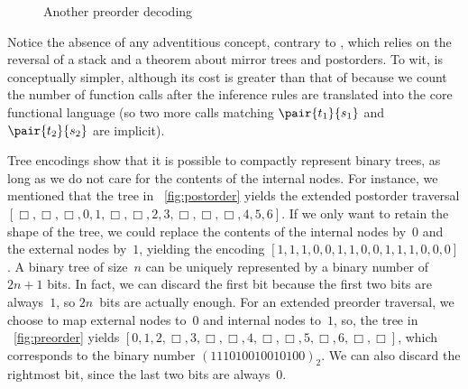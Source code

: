 \begin{figure}[b]
\abovedisplayskip=0pt
\belowdisplayskip=0pt
\centering
{}
\caption{Another preorder decoding}
\label{fig:pre2b0}
\end{figure}
Notice the absence of any adventitious concept, contrary to
, which relies on the
reversal of a stack and a theorem about mirror
trees and postorders. To wit,
 is conceptually
simpler, although its cost is greater than that of
 because we count the number
of function calls after the inference rules
are translated into the core functional language (so two more calls
matching \(\pair{t_1}{s_1}\) and \(\pair{t_2}{s_2}\) are implicit).

Tree encodings show that it is possible to compactly represent binary
trees, as long as we do not care for the contents of the internal
nodes. For instance, we mentioned that the tree in
\fig~\vref{fig:postorder} yields the extended postorder traversal \([\Box, \Box, \Box, 0, 1, \Box,
  \Box, 2, 3, \Box, \Box, \Box, 4, 5, 6]\). If we only want to retain
the shape of the tree, we could replace the contents of the internal
nodes by~\(0\) and the external nodes by~\(1\), yielding the encoding
\([1,1,1,0,0,1,1,0,0,1,1,1,0,0,0]\). A binary tree of size~\(n\) can
be uniquely represented by a binary number of \(2n+1\) bits. In fact,
we can discard the first bit because the first two bits are
always~\(1\), so \(2n\)~bits are actually enough. For an extended
preorder traversal, we choose to map external nodes to~\(0\) and
internal nodes to~\(1\), so, the tree in \fig~\vref{fig:preorder}
yields \([0, 1, 2, \Box, 3, \Box, \Box, 4, \Box, \Box, 5, \Box, 6,
  \Box, \Box]\), which corresponds to the binary number
\((111010010010100)_2\). We can also discard the rightmost bit, since
the last two bits are always~\(0\).

